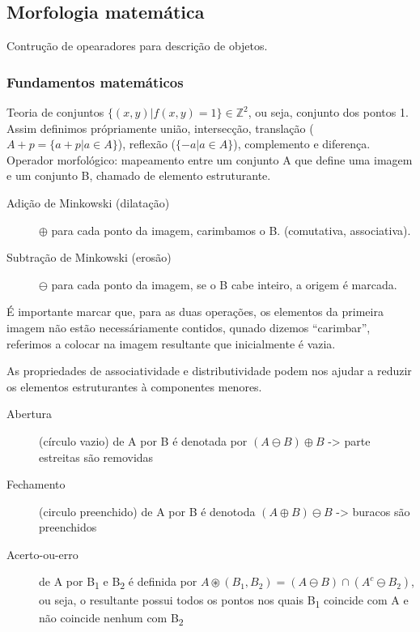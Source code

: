 \documentclass[twocolumn, 10pt]{article}
\begin{document}
\subsection*{Morfologia matemática}
\label{sec:orgfd08e12}
Contrução de opearadores para descrição de objetos.
\subsubsection*{Fundamentos matemáticos}
\label{sec:org8fdedbf}
Teoria de conjuntos \(\{(x,y) | f(x,y) = 1\} \in \mathbb{Z}^2\), ou seja, conjunto dos pontos 1.
Assim definimos própriamente união, intersecção, translação  (\(A + p = \{a + p | a \in A\}\)), reflexão (\(\{-a | a \in A\}\)), complemento e diferença.
Operador morfológico: mapeamento entre um conjunto A que define uma imagem e um conjunto B, chamado de elemento estruturante.

\begin{description}
\item[{Adição de Minkowski (dilatação)}] \(\oplus\) para cada ponto da imagem, carimbamos o B. (comutativa, associativa).
\item[{Subtração de Minkowski (erosão)}] \(\ominus\) para cada ponto da imagem, se o B cabe inteiro, a origem é marcada.
\end{description}
É importante marcar que, para as duas operações, os elementos da primeira imagem não estão necessáriamente contidos, qunado dizemos ``carimbar'', referimos a colocar na imagem resultante que inicialmente é vazia.

As propriedades de associatividade e distributividade podem nos ajudar a reduzir os elementos estruturantes à componentes menores.
\begin{description}
\item[{Abertura}] (círculo vazio) de A por B é denotada por \((A \ominus B) \oplus B\) -> parte estreitas são removidas
\item[{Fechamento}] (circulo preenchido) de A por B é denotoda \((A \oplus B) \ominus B\) -> buracos são preenchidos
\item[{Acerto-ou-erro}] de A por B\textsubscript{1} e B\textsubscript{2} é definida por \(A\circledast (B_1, B_2) = (A \ominus B) \cap (A^c \ominus B_2)\), ou seja, o resultante possui todos os pontos nos quais B\textsubscript{1} coincide com A e não coincide nenhum com B\textsubscript{2}
\end{description}
\end{document}
